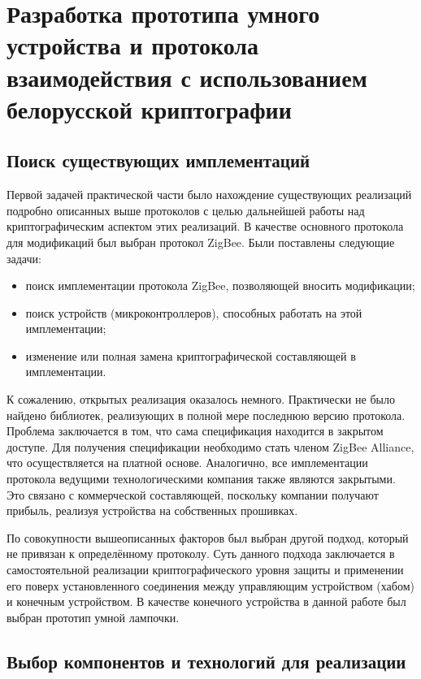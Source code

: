 \chapter{Разработка прототипа умного устройства и протокола взаимодействия с использованием 
	белорусской криптографии}

	\section{Поиск существующих имплементаций}
	
	Первой задачей практической части было нахождение существующих реализаций подробно описанных
	выше протоколов с целью дальнейшей работы над криптографическим аспектом этих реализаций.
	В качестве основного протокола для модификаций был выбран протокол ZigBee. Были поставлены
	следующие задачи:
	
	\begin{itemize}
		\item поиск имплементации протокола ZigBee, позволяющей вносить модификации; 
		\item поиск устройств (микроконтроллеров), способных работать на этой имплементации;
		\item изменение или полная замена криптографической составляющей в имплементации.
	\end{itemize}

	К сожалению, открытых реализация оказалось немного. Практически не было найдено библиотек,
	реализующих в полной мере последнюю версию протокола. Проблема заключается в том, что сама
	спецификация находится в закрытом доступе. Для получения спецификации необходимо стать
	членом ZigBee Alliance, что осуществляется на платной основе. Аналогично, все имплементации
	протокола ведущими технологическими компания также являются закрытыми. Это связано с
	коммерческой составляющей, поскольку компании получают прибыль, реализуя устройства
	на собственных прошивках.
	
	По совокупности вышеописанных факторов был выбран другой подход, который не привязан
	к определённому протоколу. Суть данного подхода заключается в самостоятельной реализации
	криптографического уровня защиты и применении его поверх установленного соединения между
	управляющим устройством (хабом) и конечным устройством. В качестве конечного устройства
	в данной работе был выбран прототип умной лампочки.
	
	
	\section{Выбор компонентов и технологий для реализации}
	
